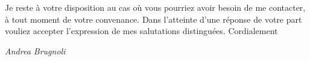 \documentclass[11pt]{letter}
\begin{document}
Je reste à votre disposition au cas où vous pourriez avoir besoin de me contacter, à tout moment de votre convenance. Dans l'atteinte d'une réponse de votre part vouliez accepter l'expression de mes salutations distinguées. Cordialement


 \begin{center}
 \large\textit{Andrea Brugnoli}
 \end{center}
 
\end{document}
